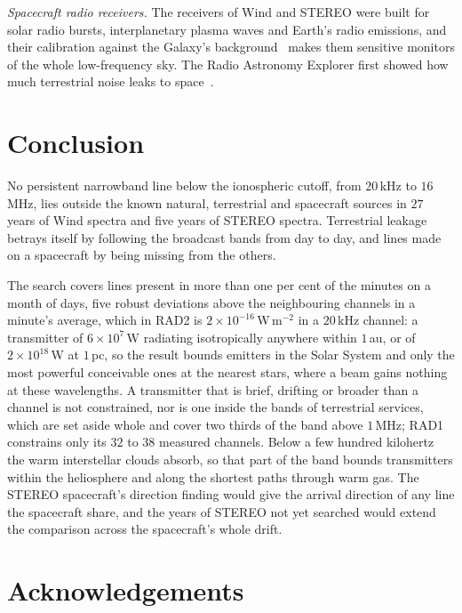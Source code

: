 \documentclass[3p,11pt]{elsarticle}
\begin{document}
\emph{Spacecraft radio receivers.} The receivers of Wind and STEREO were built for solar
radio bursts, interplanetary plasma waves and Earth's radio emissions, and their
calibration against the Galaxy's background~\cite{Dulk2001} makes them sensitive
monitors of the whole low-frequency sky. The Radio Astronomy Explorer first showed how
much terrestrial noise leaks to space~\cite{Herman1973}.

\section{Conclusion}\label{sec:conclusion}

No persistent narrowband line below the ionospheric cutoff, from $20$\,kHz to $16$\,MHz,
lies outside the known natural, terrestrial and spacecraft sources in $27$ years of Wind
spectra and five years of STEREO spectra. Terrestrial leakage betrays itself by
following the broadcast bands from day to day, and lines made on a spacecraft by being
missing from the others.

The search covers lines present in more than one per cent of the minutes on a month of
days, five robust deviations above the neighbouring channels in a minute's average,
which in RAD2 is $2\times10^{-16}$\,W\,m$^{-2}$ in a $20$\,kHz channel: a transmitter
of $6\times10^{7}$\,W radiating isotropically anywhere within $1$\,au, or of
$2\times10^{18}$\,W at $1$\,pc, so the result bounds emitters in the Solar System and
only the most powerful conceivable ones at the nearest stars, where a beam gains
nothing at these wavelengths. A
transmitter that is brief, drifting or broader than a channel is not constrained, nor is
one inside the bands of terrestrial services, which are set aside whole and cover two
thirds of the band above $1$\,MHz; RAD1 constrains only its $32$ to $38$ measured
channels. Below a few
hundred kilohertz the warm interstellar clouds absorb, so that part of the band bounds
transmitters within the heliosphere and along the shortest paths through warm gas. The STEREO
spacecraft's direction finding would give the arrival direction of any line the
spacecraft share, and the years of STEREO not yet searched would extend the comparison
across the spacecraft's whole drift.

\section*{Acknowledgements}
\end{document}
